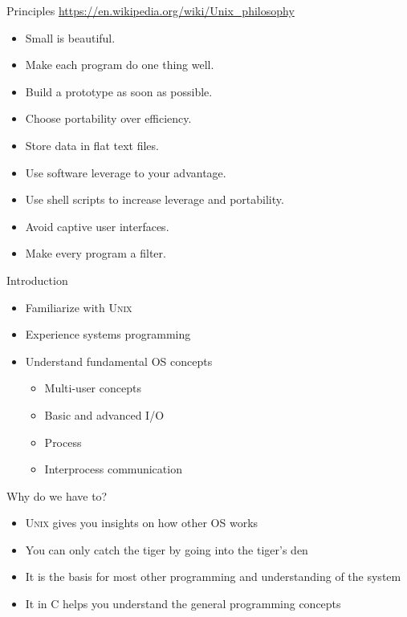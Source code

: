 \documentclass[newPxFont,sthlmFooter,nooffset]{beamer}
\begin{document}
\begin{frame}[t]{Principles}
\url{https://en.wikipedia.org/wiki/Unix_philosophy}
\bigskip
\begin{itemize}
\item Small is beautiful.
\item Make each program do one thing well.
\item Build a prototype as soon as possible.
\item Choose portability over efficiency.
\item Store data in flat text files.
\item Use software leverage to your advantage.
\item Use shell scripts to increase leverage and portability.
\item Avoid captive user interfaces.
\item Make every program a filter.
\end{itemize}
\end{frame}


\begin{frame}[t]{Introduction}
\begin{itemize}
 \item Familiarize with \textsc{Unix}
 \item Experience systems programming
 \item Understand fundamental OS concepts
  \begin{itemize}
    \item Multi-user concepts
    \item Basic and advanced I/O
    \item Process
    \item Interprocess communication
  \end{itemize}
\end{itemize}
\end{frame}



\begin{frame}[t]{Why do we have to?}
\begin{itemize}
 \item \textsc{Unix} gives you insights on how other OS works
 \item You can only catch the tiger by going into the tiger's den
 \item It is the basis for most other programming and understanding of the system
 \item It in C helps you understand the general programming concepts
\end{itemize}
\end{frame}
\end{document}

